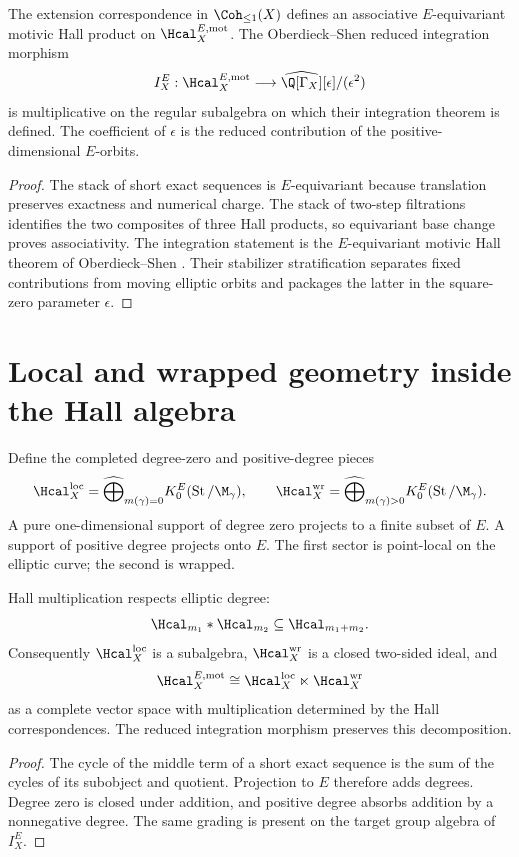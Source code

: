 \begin{theorem}
The extension correspondence in $\Coh_{\leq1}(X)$ defines an associative $E$-equivariant motivic Hall product on $\Hcal_X^{E,\mathrm{mot}}$.  The Oberdieck--Shen reduced integration morphism
\[
 I_X^E:\Hcal_X^{E,\mathrm{mot}}
 \longrightarrow
 \widehat{\Q[\Gamma_X]}[\epsilon]/(\epsilon^2)
\]
is multiplicative on the regular subalgebra on which their integration theorem is defined.  The coefficient of $\epsilon$ is the reduced contribution of the positive-dimensional $E$-orbits.
\end{theorem}
\begin{proof}
The stack of short exact sequences is $E$-equivariant because translation preserves exactness and numerical charge.  The stack of two-step filtrations identifies the two composites of three Hall products, so equivariant base change proves associativity.  The integration statement is the $E$-equivariant motivic Hall theorem of Oberdieck--Shen \cite{OberdieckShen}.  Their stabilizer stratification separates fixed contributions from moving elliptic orbits and packages the latter in the square-zero parameter $\epsilon$.
\end{proof}

\chapter{Local and wrapped geometry inside the Hall algebra}
Define the completed degree-zero and positive-degree pieces
\[
 \Hcal_X^{\mathrm{loc}}
 =\widehat\bigoplus_{m(\gamma)=0}
 K_0^E(\operatorname{St}/\M_\gamma),
 \qquad
 \Hcal_X^{\mathrm{wr}}
 =\widehat\bigoplus_{m(\gamma)>0}
 K_0^E(\operatorname{St}/\M_\gamma).
\]
A pure one-dimensional support of degree zero projects to a finite subset of $E$.  A support of positive degree projects onto $E$.  The first sector is point-local on the elliptic curve; the second is wrapped.

\begin{theorem}
Hall multiplication respects elliptic degree:
\[
 \Hcal_{m_1}*\Hcal_{m_2}\subseteq\Hcal_{m_1+m_2}.
\]
Consequently $\Hcal_X^{\mathrm{loc}}$ is a subalgebra, $\Hcal_X^{\mathrm{wr}}$ is a closed two-sided ideal, and
\[
 \Hcal_X^{E,\mathrm{mot}}
 \cong
 \Hcal_X^{\mathrm{loc}}\ltimes\Hcal_X^{\mathrm{wr}}
\]
as a complete vector space with multiplication determined by the Hall correspondences.  The reduced integration morphism preserves this decomposition.
\end{theorem}
\begin{proof}
The cycle of the middle term of a short exact sequence is the sum of the cycles of its subobject and quotient.  Projection to $E$ therefore adds degrees.  Degree zero is closed under addition, and positive degree absorbs addition by a nonnegative degree.  The same grading is present on the target group algebra of $I_X^E$.
\end{proof}

